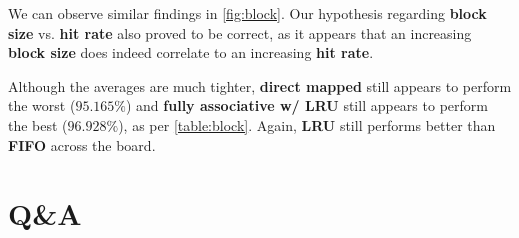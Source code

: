 \documentclass[12pt, letterpaper]{article}
\begin{document}
We can observe similar findings in \autoref{fig:block}. Our hypothesis regarding \textbf{block size} vs. \textbf{hit rate} also proved to be correct, as it appears that an increasing \textbf{block size} does indeed correlate to an increasing \textbf{hit rate}.
\bigskip

Although the averages are much tighter, \textbf{direct mapped} still appears to perform the worst ($ 95.165\% $) and \textbf{fully associative w/ LRU} still appears to perform the best ($ 96.928\% $), as per \autoref{table:block}. Again, \textbf{LRU} still performs better than \textbf{FIFO} across the board.

\section*{Q\&A}
\end{document}
